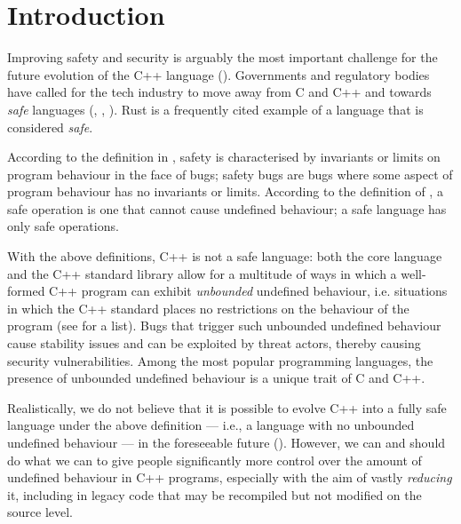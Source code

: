 
\tableofcontents*
\pagebreak





\section{Introduction}
\label{intro}

Improving safety and security is arguably the most important challenge for the future evolution of the C++ language (\cite{Bastien2023}). Governments and regulatory bodies have called for the tech industry to move away from C and C++ and towards \emph{safe} languages (\cite{NSA2022}, \cite{CR2023}, \cite{CISA2023}). Rust is a frequently cited example of a language that is considered \emph{safe}.

According to the definition in \cite{Carruth2023}, safety is characterised by invariants or limits on program behaviour in the face of bugs; safety bugs are bugs where some aspect of program behaviour has no invariants or limits. According to the definition of \cite{Abrahams2023}, a safe operation is one that cannot cause undefined behaviour; a safe language has only safe operations.

With the above definitions, C++ is not a safe language: both the core language and the C++ standard library allow for a multitude of ways in which a well-formed C++ program can exhibit \emph{unbounded} undefined behaviour, i.e. situations in which the C++ standard places no restrictions on the behaviour of the program (see \cite{P1705R1} for a list). Bugs that trigger such unbounded undefined behaviour cause stability issues and can be exploited by threat actors, thereby causing security vulnerabilities. Among the most popular programming languages, the presence of unbounded undefined behaviour is a unique trait of C and C++. 

Realistically, we do not believe that it is possible to evolve C++ into a fully safe language under the above definition --- i.e., a language with no unbounded undefined behaviour --- in the foreseeable future (\cite{Doumler2023}). However, we can and should do what we can to give people significantly more control over the amount of undefined behaviour in C++ programs, especially with the aim of vastly \emph{reducing} it, including in legacy code that may be recompiled but not modified on the source level.

